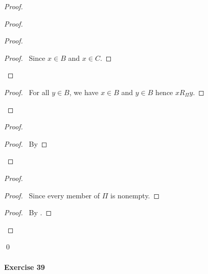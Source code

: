 \documentclass{report}
\begin{document}
    \begin{proof}
        \pf
        \begin{proof}
            \begin{proof}
                \begin{proof}
                    \pf\ Since $x \in B$ and $x \in C$.
                \end{proof}
            \end{proof}
            \begin{proof}
                \pf\ For all $y \in B$, we have $x \in B$ and $y \in B$ hence $x R_\Pi y$.
            \end{proof}
        \end{proof}
        \begin{proof}
            \begin{proof}
                \pf\ By 
            \end{proof}
        \end{proof}
        \begin{proof}
            \begin{proof}
                \pf\ Since every member of $\Pi$ is nonempty.
            \end{proof}
            \begin{proof}
                \pf\ By .
            \end{proof}
        \end{proof}
        \qed
    \end{proof}

    \paragraph{Exercise 39}
\end{document}
